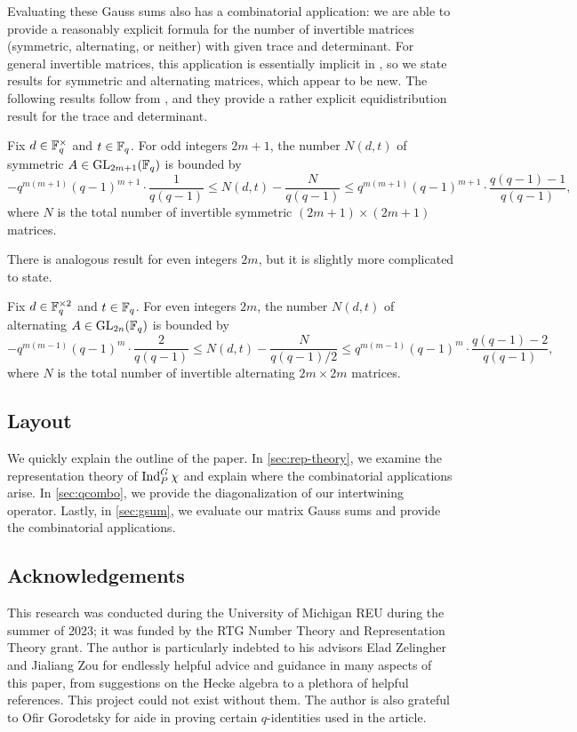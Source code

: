 \documentclass{amsart}
\begin{document}
Evaluating these Gauss sums also has a combinatorial application: we are able to provide a reasonably explicit formula for the number of invertible matrices (symmetric, alternating, or neither) with given trace and determinant. For general invertible matrices, this application is essentially implicit in \cite[Theorem~6.2]{kim-gauss-sum}, so we state results for symmetric and alternating matrices, which appear to be new. The following results follow from , and they provide a rather explicit equidistribution result for the trace and determinant.
\begin{theorem}
    Fix $d\in\mathbb F_q^\times$ and $t\in\mathbb F_q$. For odd integers $2m+1$, the number $N(d,t)$ of symmetric $A\in\mathrm{GL}_{2m+1}(\mathbb F_q)$ is bounded by
    \[-q^{m(m+1)}(q-1)^{m+1}\cdot\frac{1}{q(q-1)}\le N(d,t)-\frac N{q(q-1)}\le q^{m(m+1)}(q-1)^{m+1}\cdot\frac{q(q-1)-1}{q(q-1)},\]
    where $N$ is the total number of invertible symmetric $(2m+1)\times(2m+1)$ matrices.
\end{theorem}
\begin{remark}
    There is analogous result for even integers $2m$, but it is slightly more complicated to state.
\end{remark}
\begin{theorem}
    Fix $d\in\mathbb F_q^{\times2}$ and $t\in\mathbb F_q$. For even integers $2m$, the number $N(d,t)$ of alternating $A\in\mathrm{GL}_{2n}(\mathbb F_q)$ is bounded by
    \[-q^{m(m-1)}(q-1)^m\cdot\frac2{q(q-1)}\le N(d,t)-\frac N{q(q-1)/2}\le q^{m(m-1)}(q-1)^m\cdot\frac{q(q-1)-2}{q(q-1)},\]
    where $N$ is the total number of invertible alternating $2m\times2m$ matrices.
\end{theorem}

\subsection{Layout}
We quickly explain the outline of the paper. In \cref{sec:rep-theory}, we examine the representation theory of $\operatorname{Ind}_P^G\chi$ and explain where the combinatorial applications arise. In \cref{sec:qcombo}, we provide the diagonalization of our intertwining operator. Lastly, in \cref{sec:gsum}, we evaluate our matrix Gauss sums and provide the combinatorial applications.

\subsection{Acknowledgements}
This research was conducted during the University of Michigan REU during the summer of 2023; it was funded by the RTG Number Theory and Representation Theory grant. The author is particularly indebted to his advisors Elad Zelingher and Jialiang Zou for endlessly helpful advice and guidance in many aspects of this paper, from suggestions on the Hecke algebra to a plethora of helpful references. This project could not exist without them. The author is also grateful to Ofir Gorodetsky for aide in proving certain $q$-identities used in the article.
\end{document}
